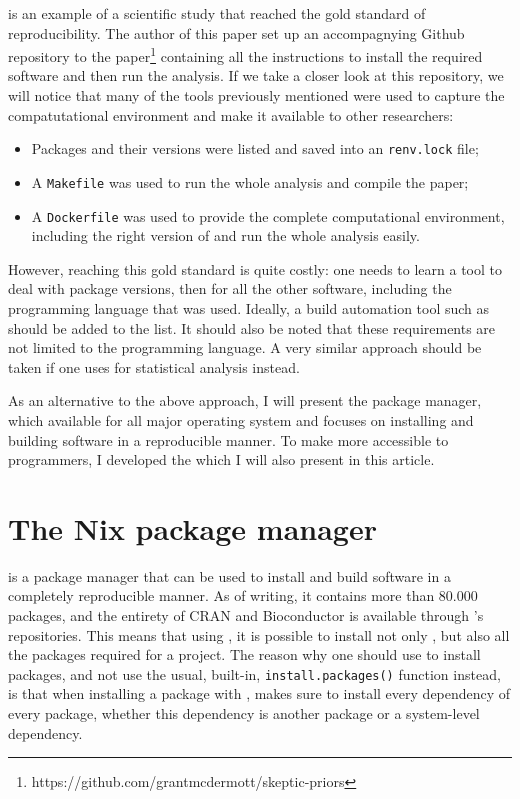\documentclass[
  article]{jss}
\providecommand{\tightlist}{%
  \setlength{\itemsep}{0pt}\setlength{\parskip}{0pt}}\usepackage{longtable,booktabs,array}
\begin{document}
\citet{mcdermott2021} is an example of a scientific study that reached
the gold standard of reproducibility. The author of this paper set up an
accompagnying Github repository to the paper\footnote{https://github.com/grantmcdermott/skeptic-priors}
containing all the instructions to install the required software and
then run the analysis. If we take a closer look at this repository, we
will notice that many of the tools previously mentioned were used to
capture the compatutational environment and make it available to other
researchers:

\begin{itemize}
\tightlist
\item
  Packages and their versions were listed and saved into an
  \texttt{renv.lock} file;
\item
  A \texttt{Makefile} was used to run the whole analysis and compile the
  paper;
\item
  A \texttt{Dockerfile} was used to provide the complete computational
  environment, including the right version of  and run the
  whole analysis easily.
\end{itemize}

However, reaching this gold standard is quite costly: one needs to learn
a tool to deal with package versions, then  for all the
other software, including the programming language that was used.
Ideally, a build automation tool such as  should be added
to the list. It should also be noted that these requirements are not
limited to the  programming language. A very similar
approach should be taken if one uses  for statistical
analysis instead.

As an alternative to the above approach, I will present the
 package manager, which available for all major operating
system and focuses on installing and building software in a reproducible
manner. To make  more accessible to 
programmers, I developed the  which I will also present in this
article.

\section{The Nix package manager}\label{the-nix-package-manager}

 is a package manager that can be used to install and
build software in a completely reproducible manner. As of writing, it
contains more than 80.000 packages, and the entirety of CRAN and
Bioconductor is available through 's repositories. This
means that using , it is possible to install not only
, but also all the packages required for a project. The
reason why one should use  to install 
packages, and not use the usual, built-in, \texttt{install.packages()}
 function instead, is that when installing a package with
,  makes sure to install every dependency of
every package, whether this dependency is another  package
or a system-level dependency.
\end{document}
